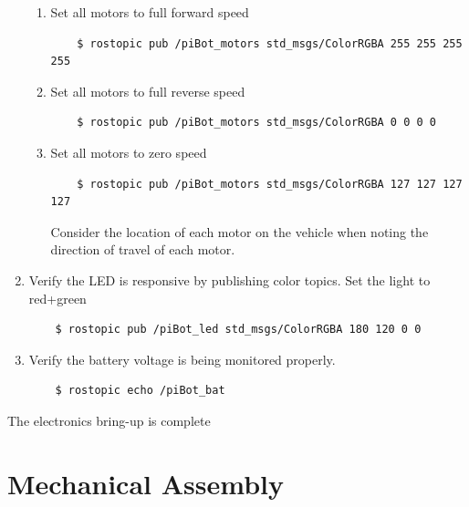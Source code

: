 \documentclass[12pt,titlepage,oneside]{memoir}
\begin{document}
\begin{enumerate}
\begin{enumerate}
	\item Set all motors to full forward speed
	\begin{verbatim}
	$ rostopic pub /piBot_motors std_msgs/ColorRGBA 255 255 255 255
	\end{verbatim}
	\item Set all motors to full reverse speed
	\begin{verbatim}
	$ rostopic pub /piBot_motors std_msgs/ColorRGBA 0 0 0 0
	\end{verbatim}
	\item Set all motors to zero speed
	\begin{verbatim}
	$ rostopic pub /piBot_motors std_msgs/ColorRGBA 127 127 127 127
	\end{verbatim}
	Consider the location of each motor on the vehicle when noting the direction of travel of each
 motor.
 	\end{enumerate}
 	\item Verify the LED is responsive by publishing color topics. Set the light to red+green
 	\begin{verbatim}
 	$ rostopic pub /piBot_led std_msgs/ColorRGBA 180 120 0 0
 	\end{verbatim}
 	\item Verify the battery voltage is being monitored properly.
 	\begin{verbatim}
 	$ rostopic echo /piBot_bat
 	\end{verbatim}
\end{enumerate}
The electronics bring-up is complete

\section{Mechanical Assembly}
\end{document}
